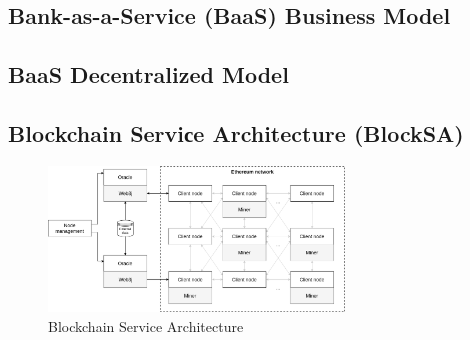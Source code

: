 \documentclass{article}
\begin{document}
\begin{multicols}{2}
\subsection{Bank-as-a-Service (BaaS) Business Model}

\subsection{BaaS Decentralized Model}

\subsection{Blockchain Serviсe Architecture (BlockSA)}

\begin{figure}
  \centering
  \includegraphics[width=0.7\textwidth]{blockchain-microservice-architecture.png}
  \caption{Blockchain Service Architecture}
  \label{fig:architecture}
\end{figure}


\end{multicols}
\end{document}
